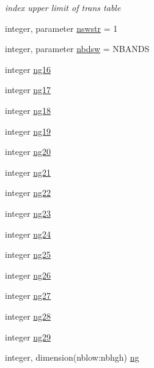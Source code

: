 \begin{DoxyCompactItemize}
\begin{DoxyCompactList}\small\item\em index upper limit of trans table \end{DoxyCompactList}\item 
integer, parameter \hyperlink{namespacemodule__radsw__parameters_a3d4238ce9a40d70a6cdfe241d640ff5f}{nswstr} = 1
\item 
integer, parameter \hyperlink{namespacemodule__radsw__parameters_ab1e121fde29dde00871e4a7d43be1ddb}{nbdsw} = N\+B\+A\+N\+DS
\item 
integer \hyperlink{namespacemodule__radsw__parameters_a442b3758f00a388cd8b7129ba910942a}{ng16}
\item 
integer \hyperlink{namespacemodule__radsw__parameters_af1f90ffe5780463d1e2edbe0e8dfd1f9}{ng17}
\item 
integer \hyperlink{namespacemodule__radsw__parameters_ac00a8e59e4f7e584af9b453c2c9fe35d}{ng18}
\item 
integer \hyperlink{namespacemodule__radsw__parameters_ab3551e23105cd3515e887e877407dc39}{ng19}
\item 
integer \hyperlink{namespacemodule__radsw__parameters_a1619a2243f1cb29e4393598fa0bc4c8f}{ng20}
\item 
integer \hyperlink{namespacemodule__radsw__parameters_ab029caf0ee0c1195539643bef00e0598}{ng21}
\item 
integer \hyperlink{namespacemodule__radsw__parameters_a655c1f742fc97d58c32131e8a85cb6fd}{ng22}
\item 
integer \hyperlink{namespacemodule__radsw__parameters_a0c4f1d2f9438850994bcedb395d07f40}{ng23}
\item 
integer \hyperlink{namespacemodule__radsw__parameters_ae25ce9a47816b83c6c57440747f1975f}{ng24}
\item 
integer \hyperlink{namespacemodule__radsw__parameters_a3361783dd00dc40ee9f93c7f428c4e58}{ng25}
\item 
integer \hyperlink{namespacemodule__radsw__parameters_afcc02ded0358f9465eb9987226522266}{ng26}
\item 
integer \hyperlink{namespacemodule__radsw__parameters_a56a6dfca4ad450a5ccc910864780a971}{ng27}
\item 
integer \hyperlink{namespacemodule__radsw__parameters_aa2530abff6c981c3f3e70ef097f90ffc}{ng28}
\item 
integer \hyperlink{namespacemodule__radsw__parameters_aa53b1af0366b40653a6f0868858b9f3d}{ng29}
\item 
integer, dimension(nblow\+:nbhgh) \hyperlink{namespacemodule__radsw__parameters_aff9670cd3f5bef92ca998e491e28986e}{ng}

\end{DoxyCompactItemize}
